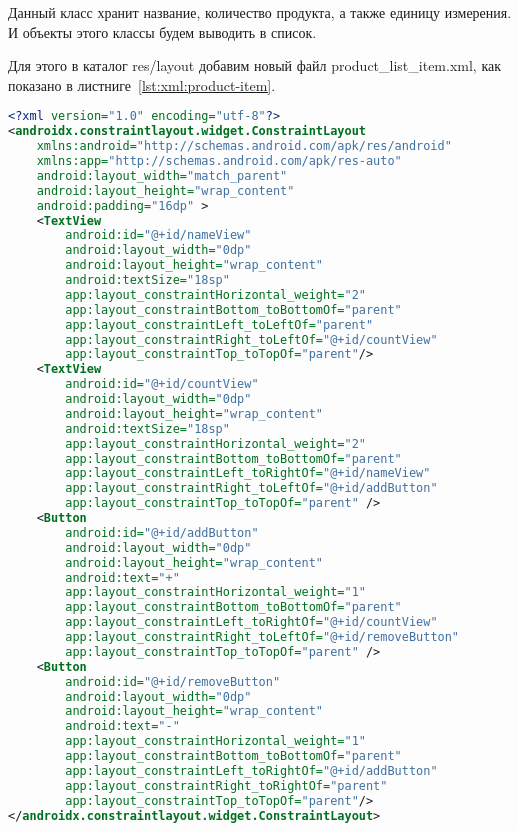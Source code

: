 Данный класс хранит название, количество продукта, а также единицу
измерения. И объекты этого классы будем выводить в список.\par
Для этого в каталог res/layout добавим новый файл product\_list\_item.xml,
как показано в листниге~\ref{lst:xml:product-item}.

\begin{lstlisting}[language=XML
	, label=lst:xml:product-item
	]
<?xml version="1.0" encoding="utf-8"?>
<androidx.constraintlayout.widget.ConstraintLayout
    xmlns:android="http://schemas.android.com/apk/res/android"
    xmlns:app="http://schemas.android.com/apk/res-auto"
    android:layout_width="match_parent"
    android:layout_height="wrap_content"
    android:padding="16dp" >
    <TextView
        android:id="@+id/nameView"
        android:layout_width="0dp"
        android:layout_height="wrap_content"
        android:textSize="18sp"
        app:layout_constraintHorizontal_weight="2"
        app:layout_constraintBottom_toBottomOf="parent"
        app:layout_constraintLeft_toLeftOf="parent"
        app:layout_constraintRight_toLeftOf="@+id/countView"
        app:layout_constraintTop_toTopOf="parent"/>
    <TextView
        android:id="@+id/countView"
        android:layout_width="0dp"
        android:layout_height="wrap_content"
        android:textSize="18sp"
        app:layout_constraintHorizontal_weight="2"
        app:layout_constraintBottom_toBottomOf="parent"
        app:layout_constraintLeft_toRightOf="@+id/nameView"
        app:layout_constraintRight_toLeftOf="@+id/addButton"
        app:layout_constraintTop_toTopOf="parent" />
    <Button
        android:id="@+id/addButton"
        android:layout_width="0dp"
        android:layout_height="wrap_content"
        android:text="+"
        app:layout_constraintHorizontal_weight="1"
        app:layout_constraintBottom_toBottomOf="parent"
        app:layout_constraintLeft_toRightOf="@+id/countView"
        app:layout_constraintRight_toLeftOf="@+id/removeButton"
        app:layout_constraintTop_toTopOf="parent" />
    <Button
        android:id="@+id/removeButton"
        android:layout_width="0dp"
        android:layout_height="wrap_content"
        android:text="-"
        app:layout_constraintHorizontal_weight="1"
        app:layout_constraintBottom_toBottomOf="parent"
        app:layout_constraintLeft_toRightOf="@+id/addButton"
        app:layout_constraintRight_toRightOf="parent"
        app:layout_constraintTop_toTopOf="parent"/>
</androidx.constraintlayout.widget.ConstraintLayout>
\end{lstlisting}

